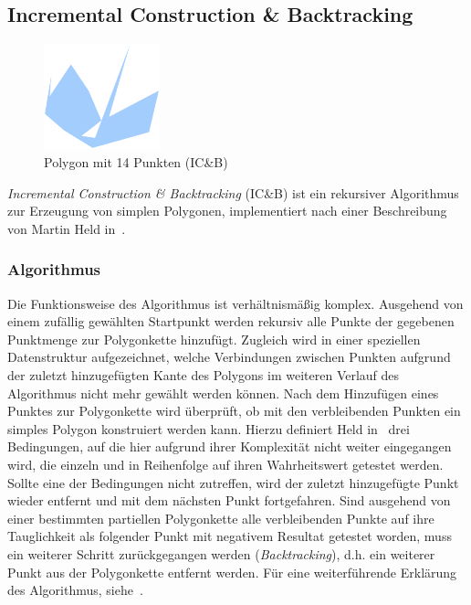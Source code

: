 \subsection{Incremental Construction \& Backtracking}

  \begin{figure}[h]
    \begin{center}
      \includegraphics[width=0.3\textwidth]{img/icb14.eps}
    \end{center}
    \caption{Polygon mit 14 Punkten (IC\&B)}
    \label{fig:icb14}
  \end{figure}

  \emph{Incremental Construction \& Backtracking} (IC\&B) ist ein rekursiver
  Algorithmus zur Erzeugung von simplen Polygonen, implementiert nach einer
  Beschreibung von Martin Held in~\cite{held98polygons}.

  \subsubsection{Algorithmus}

    Die Funktionsweise des Algorithmus ist verhältnismäßig komplex. Ausgehend
    von einem zufällig gewählten Startpunkt werden rekursiv alle Punkte der
    gegebenen Punktmenge zur Polygonkette hinzufügt. Zugleich wird in einer
    speziellen Datenstruktur aufgezeichnet, welche Verbindungen zwischen
    Punkten aufgrund der zuletzt hinzugefügten Kante des Polygons im weiteren
    Verlauf des Algorithmus nicht mehr gewählt werden können. Nach dem
    Hinzufügen eines Punktes zur Polygonkette wird überprüft, ob mit den
    verbleibenden Punkten ein simples Polygon konstruiert werden kann. Hierzu
    definiert Held in~\cite{held98polygons} drei Bedingungen, auf die hier 
    aufgrund ihrer Komplexität nicht weiter eingegangen wird, die einzeln und
    in Reihenfolge auf ihren Wahrheitswert getestet werden. Sollte eine der
    Bedingungen nicht zutreffen, wird der zuletzt hinzugefügte Punkt wieder
    entfernt und mit dem nächsten Punkt fortgefahren. Sind ausgehend von einer
    bestimmten partiellen Polygonkette alle verbleibenden Punkte auf ihre
    Tauglichkeit als folgender Punkt mit negativem Resultat getestet worden,
    muss ein weiterer Schritt zurückgegangen werden (\emph{Backtracking}),
    d.h. ein weiterer Punkt aus der Polygonkette entfernt werden. Für eine
    weiterführende Erklärung des Algorithmus, siehe~\cite{held98polygons}.

